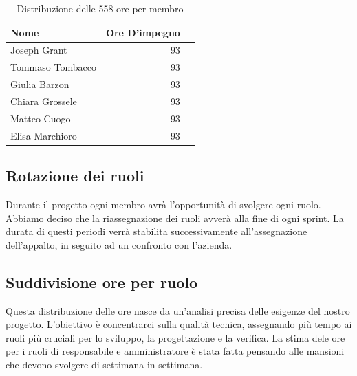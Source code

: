 \documentclass[11pt,a4paper]{article}
\begin{document}
\begin{table}[H]
    \centering
    \begin{tabular}{|l|r|r|}
        \hline
         \textbf{Nome}& \textbf{Ore D'impegno}  \\
         \hline
         Joseph Grant&93 \\
         \hline
         Tommaso Tombacco&93 \\
         \hline
         Giulia Barzon&93 \\
         \hline
         Chiara Grossele&93 \\
         \hline
         Matteo Cuogo&93 \\ 
         \hline
         Elisa Marchioro&93 \\
         \hline
    \end{tabular}
    \caption{Distribuzione delle 558 ore per membro}
    \label{tab:ore_membro}
\end{table}

\vspace{1cm}

\subsection{Rotazione dei ruoli}
Durante il progetto ogni membro avrà l'opportunità di svolgere ogni ruolo. Abbiamo deciso che la riassegnazione dei ruoli avverà alla fine di ogni sprint. La durata di questi periodi verrà stabilita successivamente all'assegnazione dell'appalto, in seguito ad un confronto con l'azienda.

\vspace{1cm}

\subsection{Suddivisione ore per ruolo}
Questa distribuzione delle ore nasce da un'analisi precisa delle esigenze del nostro progetto. L'obiettivo è concentrarci sulla qualità tecnica, assegnando più tempo ai ruoli più cruciali per lo sviluppo, la progettazione e la verifica. La stima dele ore per i ruoli di responsabile e amministratore è stata fatta pensando alle mansioni che devono svolgere di settimana in settimana.
\end{document}
